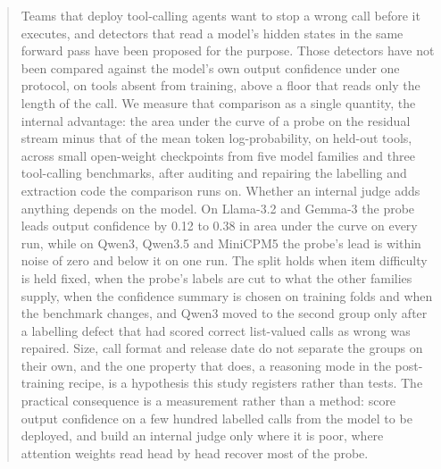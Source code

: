 \documentclass{article}
\theoremstyle{plain}
\theoremstyle{remark}
\theoremstyle{definition}
\begin{document}
\printAffiliationsAndNotice{}

\begin{abstract}
Teams that deploy tool-calling agents want to stop a wrong call before it executes, and detectors that read a model's hidden states in the same forward pass have been proposed for the purpose. Those detectors have not been compared against the model's own output confidence under one protocol, on tools absent from training, above a floor that reads only the length of the call. We measure that comparison as a single quantity, the internal advantage: the area under the curve of a probe on the residual stream minus that of the mean token log-probability, on held-out tools, across small open-weight checkpoints from five model families and three tool-calling benchmarks, after auditing and repairing the labelling and extraction code the comparison runs on. Whether an internal judge adds anything depends on the model. On Llama-3.2 and Gemma-3 the probe leads output confidence by 0.12 to 0.38 in area under the curve on every run, while on Qwen3, Qwen3.5 and MiniCPM5 the probe's lead is within noise of zero and below it on one run. The split holds when item difficulty is held fixed, when the probe's labels are cut to what the other families supply, when the confidence summary is chosen on training folds and when the benchmark changes, and Qwen3 moved to the second group only after a labelling defect that had scored correct list-valued calls as wrong was repaired. Size, call format and release date do not separate the groups on their own, and the one property that does, a reasoning mode in the post-training recipe, is a hypothesis this study registers rather than tests. The practical consequence is a measurement rather than a method: score output confidence on a few hundred labelled calls from the model to be deployed, and build an internal judge only where it is poor, where attention weights read head by head recover most of the probe.
\end{abstract}
\end{document}
